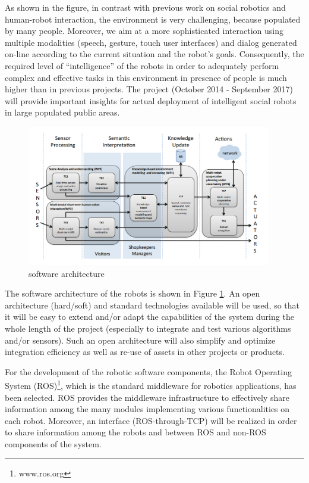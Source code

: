 As shown in the figure, in contrast with previous work on social robotics and human-robot interaction, the \coaches environment is very challenging, because populated by many people.
Moreover, we aim at a more sophisticated interaction using multiple modalities (speech, gesture, touch user interfaces) and dialog generated on-line according to the current situation
and the robot's goals.
Consequently, the required level of ``intelligence'' of the \coaches robots in order to adequately perform complex and effective tasks in this environment in presence of people is much higher than in previous projects.
The \coaches project (October 2014 - September 2017) will provide important insights for actual deployment of intelligent social robots in large populated public areas. 



\begin{figure}[t!]
\centering
\includegraphics[width=0.95\textwidth]{fig/COACHES_swarch.png}
\caption{\coaches software architecture}
\label{fig:swarch}
\end{figure}

The software architecture of the \coaches robots is shown in Figure \ref{fig:swarch}.
An open architecture (hard/soft) and standard technologies available will be used, 
so that it will be easy to extend and/or adapt the capabilities of the system during the whole length of 
the  project  (especially  to  integrate  and  test  various  algorithms  and/or  sensors).  
Such an open architecture will also simplify and optimize integration efficiency as well as re-use of assets in other projects or products. 


For the development of the robotic software components, the Robot Operating System (ROS)\footnote{www.ros.org}, which is the standard middleware for robotics applications, has been selected.
ROS provides the middleware infrastructure to effectively share information among the many modules implementing various functionalities on each robot. Moreover, an interface (ROS-through-TCP) will be realized in order to share information among the robots and between ROS and non-ROS components of the system.

